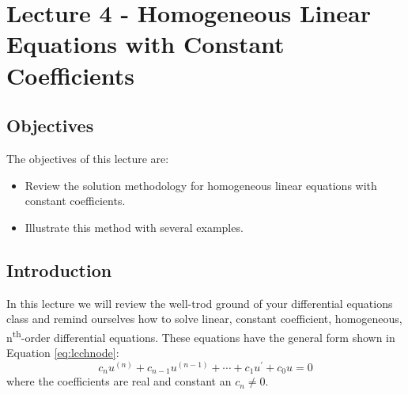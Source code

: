 \chapter{Lecture 4 - Homogeneous Linear Equations with Constant Coefficients}
\label{ch:lec4}
\section{Objectives}
The objectives of this lecture are:
\begin{itemize}
\item Review the solution methodology for homogeneous linear equations with constant coefficients.
\item Illustrate this method with several examples.
\end{itemize}
\section{Introduction}
In this lecture we will review the well-trod ground of your differential equations class and remind ourselves how to solve linear, constant coefficient, homogeneous, n\textsuperscript{th}-order differential equations.  These equations have the general form shown in Equation \ref{eq:lcchnode}:
\begin{equation}
c_nu^{(n)}+c_{n-1}u^{(n-1)}+\cdots+c_1u^{\prime}+c_0u=0
\label{eq:lcchnode}
\end{equation}
\noindent where the coefficients are real and constant an $c_n \ne 0$.

